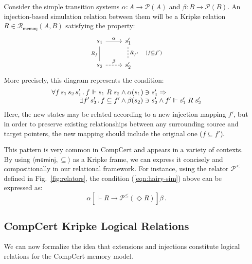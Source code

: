\documentclass[sigplan,10pt,review,anonymous]{acmart}
\newcommand{\kw}[1]{\ensuremath{ \mathsf{#1} }}
\newcommand{\ifr}[1]{\mathrel{[{#1}]}}
\begin{document}
\begin{example} \label{ex:sim} %
Consider the simple transition systems
$\alpha : A \rightarrow \mathcal{P}(A)$ and
$\beta : B \rightarrow \mathcal{P}(B)$.
An injection-based simulation relation between them
will be a Kripke relation
$R \in \mathcal{R}_\kw{meminj}(A, B)$
satisfying the property:
\[
  \begin{tikzcd}
    s_1 \arrow[r, "\alpha"]
        \arrow[d, dash, "R_f"'] &
    s_1' \arrow[d, dashed, dash, "R_{f'} \quad (f \subseteq f')"] \\
    s_2 \arrow[r, dashed, "\beta"] &
    s_2'
  \end{tikzcd}
\]
More precisely, this diagram represents the condition:
\begin{equation}
    \label{eqn:hairy-sim}
    \begin{array}{r@{}l}
    \forall f \, s_1 \, s_2 \, s_1' \,.\,
      f \Vdash s_1 \mathrel{R} s_2 &{} \wedge
      \alpha(s_1) \ni s_1' \Rightarrow \\
    \exists f' \, s_2' \,.\,
      f \subseteq f' &{} \wedge
      \beta(s_2) \ni s_2' \wedge
      f' \Vdash s_1' \mathrel{R} s_2'
    \end{array}
\end{equation}
Here, the new states may be related according to
a new injection mapping $f'$,
but in order to preserve existing relationships
between any surrounding source and target pointers,
the new mapping should include
the original one ($f \subseteq f'$).

This pattern is very common in CompCert
and appears in a variety of contexts.
By using $\langle \kw{meminj}, {\subseteq} \rangle$
as a Kripke frame,
we can express it concisely and compositionally
in our relational framework.
For instance,
using the relator $\mathcal{P}^\le$ defined in
Fig.~\ref{fig:relators},
the condition (\ref{eqn:hairy-sim}) above can be expressed
as:
\[
  \alpha \ifr{\Vdash R \rightarrow \mathcal{P}^\le(\Diamond R)} \beta \,.
\]
\end{example}


\subsection{CompCert Kripke Logical Relations} %

We can now formalize the idea that
extensions and injections
constitute logical relations for the CompCert memory model.
\end{document}
